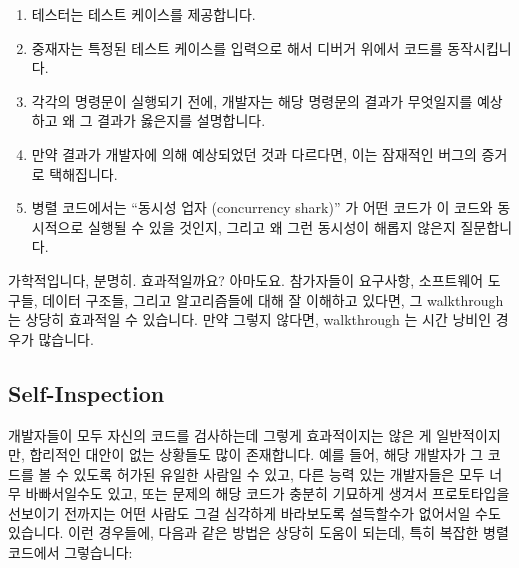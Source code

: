 \begin{enumerate}
\item	테스터는 테스트 케이스를 제공합니다.
\item	중재자는 특정된 테스트 케이스를 입력으로 해서 디버거 위에서 코드를
	동작시킵니다.
\item	각각의 명령문이 실행되기 전에, 개발자는 해당 명령문의 결과가 무엇일지를
	예상하고 왜 그 결과가 옳은지를 설명합니다.
\item	만약 결과가 개발자에 의해 예상되었던 것과 다르다면, 이는 잠재적인
	버그의 증거로 택해집니다.
\item	병렬 코드에서는 ``동시성 업자 (concurrency shark)'' 가 어떤 코드가 이
	코드와 동시적으로 실행될 수 있을 것인지, 그리고 왜 그런 동시성이 해롭지
	않은지 질문합니다.

\end{enumerate}

가학적입니다, 분명히.
효과적일까요?
아마도요.
참가자들이 요구사항, 소프트웨어 도구들, 데이터 구조들, 그리고 알고리즘들에 대해
잘 이해하고 있다면, 그 walkthrough 는 상당히 효과적일 수 있습니다.
만약 그렇지 않다면, walkthrough 는 시간 낭비인 경우가 많습니다.

\subsection{Self-Inspection}
\label{sec:debugging:Self-Inspection}

개발자들이 모두 자신의 코드를 검사하는데 그렇게 효과적이지는 않은 게
일반적이지만, 합리적인 대안이 없는 상황들도 많이 존재합니다.
예를 들어, 해당 개발자가 그 코드를 볼 수 있도록 허가된 유일한 사람일 수 있고,
다른 능력 있는 개발자들은 모두 너무 바빠서일수도 있고, 또는 문제의 해당 코드가
충분히 기묘하게 생겨서 프로토타입을 선보이기 전까지는 어떤 사람도 그걸 심각하게
바라보도록 설득할수가 없어서일 수도 있습니다.
이런 경우들에, 다음과 같은 방법은 상당히 도움이 되는데, 특히 복잡한 병렬
코드에서 그렇습니다:
\iffalse

